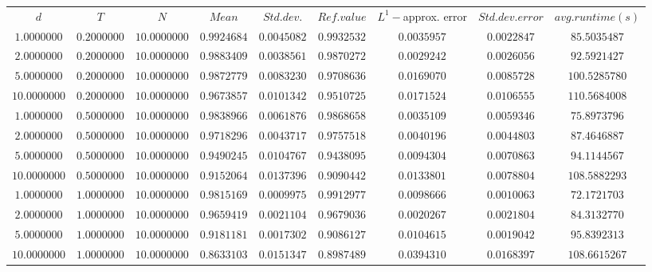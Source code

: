 \begin{tabular}{ccccccccc}
$d$ & $T$ & $N$ & $Mean$ & $Std. dev.$ & $Ref. value$ & $L^1-$approx. error & $Std. dev. error$ & $avg. runtime (s)$\\
$1.0000000$ & $0.2000000$ & $10.0000000$ & $0.9924684$ & $0.0045082$ & $0.9932532$ & $0.0035957$ & $0.0022847$ & $85.5035487$\\
$2.0000000$ & $0.2000000$ & $10.0000000$ & $0.9883409$ & $0.0038561$ & $0.9870272$ & $0.0029242$ & $0.0026056$ & $92.5921427$\\
$5.0000000$ & $0.2000000$ & $10.0000000$ & $0.9872779$ & $0.0083230$ & $0.9708636$ & $0.0169070$ & $0.0085728$ & $100.5285780$\\
$10.0000000$ & $0.2000000$ & $10.0000000$ & $0.9673857$ & $0.0101342$ & $0.9510725$ & $0.0171524$ & $0.0106555$ & $110.5684008$\\
$1.0000000$ & $0.5000000$ & $10.0000000$ & $0.9838966$ & $0.0061876$ & $0.9868658$ & $0.0035109$ & $0.0059346$ & $75.8973796$\\
$2.0000000$ & $0.5000000$ & $10.0000000$ & $0.9718296$ & $0.0043717$ & $0.9757518$ & $0.0040196$ & $0.0044803$ & $87.4646887$\\
$5.0000000$ & $0.5000000$ & $10.0000000$ & $0.9490245$ & $0.0104767$ & $0.9438095$ & $0.0094304$ & $0.0070863$ & $94.1144567$\\
$10.0000000$ & $0.5000000$ & $10.0000000$ & $0.9152064$ & $0.0137396$ & $0.9090442$ & $0.0133801$ & $0.0078804$ & $108.5882293$\\
$1.0000000$ & $1.0000000$ & $10.0000000$ & $0.9815169$ & $0.0009975$ & $0.9912977$ & $0.0098666$ & $0.0010063$ & $72.1721703$\\
$2.0000000$ & $1.0000000$ & $10.0000000$ & $0.9659419$ & $0.0021104$ & $0.9679036$ & $0.0020267$ & $0.0021804$ & $84.3132770$\\
$5.0000000$ & $1.0000000$ & $10.0000000$ & $0.9181181$ & $0.0017302$ & $0.9086127$ & $0.0104615$ & $0.0019042$ & $95.8392313$\\
$10.0000000$ & $1.0000000$ & $10.0000000$ & $0.8633103$ & $0.0151347$ & $0.8987489$ & $0.0394310$ & $0.0168397$ & $108.6615267$\\
\end{tabular}
